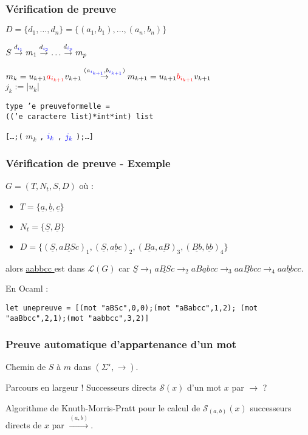 \documentclass[12pt]{beamer}
\newcommand{\norm}[1]{\lvert #1 \rvert}
\begin{document}
\begin{frame}\frametitle{Vérification de preuve}
$D = \{d_1,\dots,d_n\} = \{(a_1,b_1),\dots,(a_n,b_n)\}$

$S \overset{d_{\color{blue} i_1}}{\rightarrow} m_1 \overset{d_{\color{blue} i_2}}{\rightarrow} \dots \overset{d_{\color{blue} i_p}}{\rightarrow} m_p$

$m_k = u_{k+1} {\color{red} a_{i_{k+1}}} v_{k+1} \overset{(a_{{\color{blue} i_{k+1}}},b_{{\color{blue} i_{k+1}}})}{\rightarrow} m_{k+1} = u_{k+1} {\color{red} b_{i_{k+1}} } v_{k+1}$ \\
$j_k := \norm{u_k}$ 

{\small \color{DarkBlue}\texttt{type 'e preuveformelle = \\
(('e caractere list)*int*int) list}}

{\small \color{DarkBlue}\texttt{[\dots ;(}}
$m_k$
{\small \color{DarkBlue}\texttt{,}}
$\color{blue} i_k$
{\small \color{DarkBlue}\texttt{,}}
$\color{blue} j_k$
{\small \color{DarkBlue}\texttt{);\dots ]}}
\end{frame}
\begin{frame}\frametitle{Vérification de preuve - Exemple}
$G = (T,N_t,S,D)$ où :
\begin{itemize}
\item $T = \{\underline{ a },\underline{ b },\underline{ c }\}$
\item $N_t = \{\underline{ S },\underline{ B }\}$
\item $D = \{(\underline{ S },\underline{ aBSc })_1,(\underline{ S },\underline{ abc })_2,(\underline{ Ba },\underline{ aB })_3,(\underline{ Bb },\underline{ bb })_4\}$
\end{itemize}

alors \underline{ aabbcc } est dans $\mathcal{L}(G)$ car $\underline{ S } \rightarrow_1 \underline{ aBSc } \rightarrow_2 \underline{ aBabcc } \rightarrow_3 \underline{ aaBbcc } \rightarrow_4 \underline{ aabbcc }$.

En Ocaml :

{\small \color{DarkBlue}\texttt{let unepreuve = [(mot "aBSc",0,0);(mot "aBabcc",1,2);
		 (mot "aaBbcc",2,1);(mot "aabbcc",3,2)]}}
\end{frame}

\begin{frame}\frametitle{Preuve automatique d'appartenance d'un mot}
Chemin de $S$ à $m$ dans $(\Sigma^\star,\rightarrow)$.
\pause

Parcours en largeur ! Successeurs directs $\mathcal{S}(x)$ d'un mot $x$ par $\rightarrow$ ?
\pause

Algorithme de Knuth-Morris-Pratt pour le calcul de $\mathcal{S}_{(a,b)}(x)$ successeurs directs de $x$ par $\overset{(a,b)}{\rightarrow}$.
\end{frame}
\end{document}
